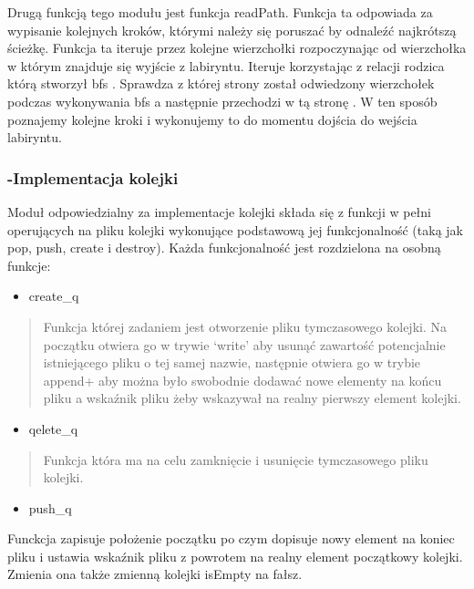 \documentclass[
]{article}
\begin{document}
Drugą funkcją tego modułu jest funkcja readPath. Funkcja ta odpowiada za
wypisanie kolejnych kroków, którymi należy się poruszać by odnaleźć
najkrótszą ścieżkę. Funkcja ta iteruje przez kolejne wierzchołki
rozpoczynając od wierzchołka w którym znajduje się wyjście z labiryntu.
Iteruje korzystając z relacji rodzica którą stworzył bfs . Sprawdza z
której strony został odwiedzony wierzchołek podczas wykonywania bfs a
następnie przechodzi w tą stronę . W ten sposób poznajemy kolejne kroki
i wykonujemy to do momentu dojścia do wejścia labiryntu.

\hypertarget{implementacja-kolejki}{%
\subsubsection{-Implementacja kolejki}\label{implementacja-kolejki}}

Moduł odpowiedzialny za implementacje kolejki składa się z funkcji w
pełni operujących na pliku kolejki wykonujące podstawową jej
funkcjonalność (taką jak pop, push, create i destroy). Każda
funkcjonalność jest rozdzielona na osobną funkcje:

\begin{itemize}
\item
  create\_q
\end{itemize}

\begin{quote}
Funkcja której zadaniem jest otworzenie pliku tymczasowego kolejki. Na
początku otwiera go w trywie `write' aby usunąć zawartość potencjalnie
istniejącego pliku o tej samej nazwie, następnie otwiera go w trybie
append+ aby można było swobodnie dodawać nowe elementy na końcu pliku a
wskaźnik pliku żeby wskazywał na realny pierwszy element kolejki.
\end{quote}

\begin{itemize}
\item
  qelete\_q
\end{itemize}

\begin{quote}
Funkcja która ma na celu zamknięcie i usunięcie tymczasowego pliku
kolejki.
\end{quote}

\begin{itemize}
\item
  push\_q
\end{itemize}

Funckcja zapisuje położenie początku po czym dopisuje nowy element na
koniec pliku i ustawia wskaźnik pliku z powrotem na realny element
początkowy kolejki. Zmienia ona także zmienną kolejki isEmpty na fałsz.
\end{document}
